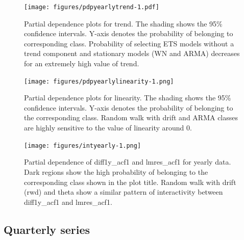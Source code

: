 \documentclass[11pt,a4paper,]{article}
\begin{document}
\begin{figure}
\centering
\texttt{[image: figures/pdpyearlytrend-1.pdf]}
\caption{\label{fig:pdpyearlytrend}Partial dependence plots for trend. The shading shows the 95\% confidence intervals. Y-axis denotes the probability of belonging to corresponding class. Probability of selecting ETS models without a trend component and stationary models (WN and ARMA) decreases for an extremely high value of trend.}
\end{figure}

\begin{figure}
\centering
\texttt{[image: figures/pdpyearlylinearity-1.png]}
\caption{\label{fig:pdpyearlylinearity}Partial dependence plots for linearity. The shading shows the 95\% confidence intervals. Y-axis denotes the probability of belonging to the corresponding class. Random walk with drift and ARMA classes are highly sensitive to the value of linearity around 0.}
\end{figure}

\begin{figure}
\centering
\texttt{[image: figures/intyearly-1.png]}
\caption{\label{fig:intyearly}Partial dependence of diff1y\_acf1 and lmres\_acf1 for yearly data. Dark regions show the high probability of belonging to the corresponding class shown in the plot title. Random walk with drift (rwd) and theta show a similar pattern of interactivity between diff1y\_acf1 and lmres\_acf1.}
\end{figure}

\hypertarget{quarterly-series}{%
\subsection{Quarterly series}\label{quarterly-series}}
\end{document}

